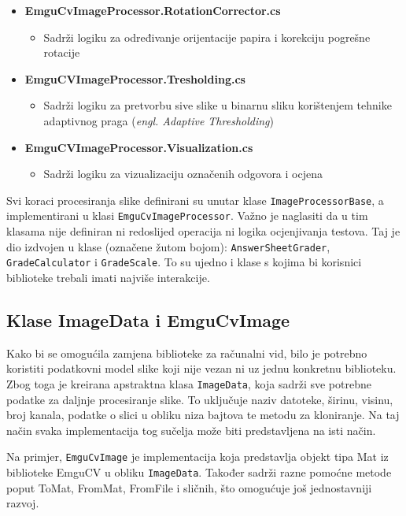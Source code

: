\documentclass{foi}
\begin{document}
\begin{itemize}
    \item \textbf{EmguCvImageProcessor.RotationCorrector.cs}
    \begin{itemize}
        \item Sadrži logiku za određivanje orijentacije papira i korekciju pogrešne rotacije
    \end{itemize}

    \item \textbf{EmguCVImageProcessor.Tresholding.cs}
    \begin{itemize}
        \item Sadrži logiku za pretvorbu sive slike u binarnu sliku korištenjem tehnike adaptivnog praga (\textit{engl. Adaptive Thresholding})
    \end{itemize}

    \item \textbf{EmguCVImageProcessor.Visualization.cs}
    \begin{itemize}
        \item Sadrži logiku za vizualizaciju označenih odgovora i ocjena
    \end{itemize}
\end{itemize}


Svi koraci procesiranja slike definirani su unutar klase \texttt{ImageProcessorBase}, a implementirani u klasi \texttt{EmguCvImageProcessor}. Važno je naglasiti da u tim klasama nije definiran ni redoslijed operacija ni logika ocjenjivanja testova. Taj je dio izdvojen u klase (označene žutom bojom): \texttt{AnswerSheetGrader}, \texttt{GradeCalculator} i \texttt{GradeScale}. To su ujedno i klase s kojima bi korisnici biblioteke trebali imati najviše interakcije.

\subsection{Klase ImageData i EmguCvImage}

Kako bi se omogućila zamjena biblioteke za računalni vid, bilo je potrebno koristiti podatkovni model slike koji nije vezan ni uz jednu konkretnu biblioteku. Zbog toga je kreirana apstraktna klasa \texttt{ImageData}, koja sadrži sve potrebne podatke za daljnje procesiranje slike. To uključuje naziv datoteke, širinu, visinu, broj kanala, podatke o slici u obliku niza bajtova te metodu za kloniranje. Na taj način svaka implementacija tog sučelja može biti predstavljena na isti način.

Na primjer, \texttt{EmguCvImage} je implementacija koja predstavlja objekt tipa Mat iz biblioteke EmguCV u obliku \texttt{ImageData}. Također sadrži razne pomoćne metode poput ToMat, FromMat, FromFile i sličnih, što omogućuje još jednostavniji razvoj.
\end{document}
